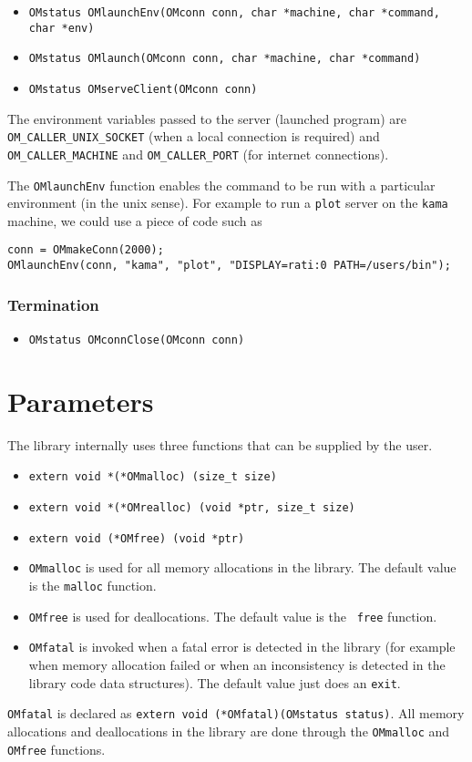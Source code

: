 \documentclass{article}
\begin{document}
\begin{itemize} 
\item 
\verb+OMstatus OMlaunchEnv(OMconn conn, char *machine, char *command, char *env)+
\item \verb+OMstatus OMlaunch(OMconn conn, char *machine, char *command)+
\item \verb+OMstatus OMserveClient(OMconn conn)+
\end{itemize} 

The environment variables passed to the server (launched program) are
{\verb+OM_CALLER_UNIX_SOCKET+} (when a local connection is required) and 
{\verb+OM_CALLER_MACHINE+} and {\verb+OM_CALLER_PORT+} (for internet
connections).

The {\tt OMlaunchEnv} function enables the command to be run with a
particular environment (in the {\sc unix} sense). For example to run a
{\tt plot} server on the {\tt kama} machine, we could use a piece of code
such as 
\begin{verbatim} 
conn = OMmakeConn(2000);
OMlaunchEnv(conn, "kama", "plot", "DISPLAY=rati:0 PATH=/users/bin");
\end{verbatim} 



\subsubsection{Termination}

\begin{itemize} 
\item \verb+OMstatus OMconnClose(OMconn conn)+
\end{itemize} 

\section{Parameters}

The library internally uses three functions that can be supplied by the user.
\begin{itemize} 
\item \verb+extern void *(*OMmalloc) (size_t size)+
\item \verb+extern void *(*OMrealloc) (void *ptr, size_t size)+
\item \verb+extern void (*OMfree) (void *ptr)+
\end{itemize} 

\begin{itemize} 
\item {\tt OMmalloc} is used for all memory allocations in the library. 
The default value is the {\tt malloc} function.
\item {\tt OMfree} is used for deallocations. The default value is the {\tt
free} function. 
\item {\tt OMfatal} is invoked when a fatal error is detected in the library
(for example when memory allocation failed or when an inconsistency is
detected in the library code data structures). The default value just does an
{\tt exit}.
\end{itemize}
{\tt OMfatal} is declared as 
{\tt extern void (*OMfatal)(OMstatus status)}. 
All memory allocations and deallocations in the library are done through the
{\tt OMmalloc} and {\tt OMfree} functions.
\end{document}
